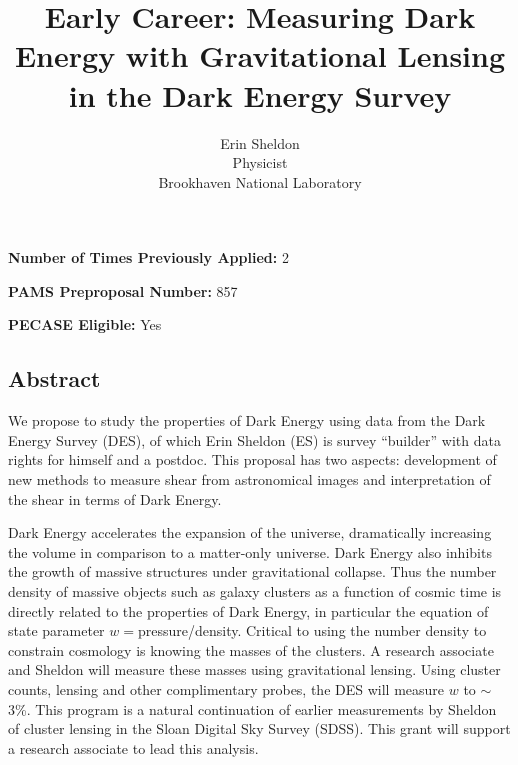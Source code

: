 \documentclass[12pt]{article}
\begin{document}
\vspace{3mm}
\noindent
{\bf Number of Times Previously Applied:} 2

\vspace{3mm}
\noindent
{\bf PAMS Preproposal Number:} 857


\vspace{3mm}
\noindent
{\bf PECASE Eligible:} Yes



\newpage

\tableofcontents

\newpage

\title{Early Career: Measuring Dark Energy with Gravitational Lensing in 
the Dark Energy Survey}
\author{Erin Sheldon\\
{\normalsize Physicist}\\
\normalsize{Brookhaven National Laboratory}}
\date{}
\maketitle

\setcounter{page}{1}
\begin{center}
\section*{Abstract}
\end{center}

We propose to study the properties of Dark Energy using data from the Dark
Energy Survey (DES), of which Erin Sheldon (ES) is survey ``builder'' with data
rights for himself and a postdoc.  This proposal has two aspects: development
of new methods to measure shear from astronomical images and interpretation of
the shear in terms of Dark Energy.

Dark Energy accelerates the expansion of the universe, dramatically increasing
the volume in comparison to a matter-only universe.  Dark Energy also inhibits
the growth of massive structures under gravitational collapse.  Thus the number
density of massive objects such as galaxy clusters as a function of cosmic time
is directly related to the properties of Dark Energy, in particular the
equation of state parameter $w=$pressure/density.  Critical to using the number
density to constrain cosmology is knowing the masses of the clusters. A
research associate and Sheldon will measure these masses using gravitational
lensing.  Using cluster counts, lensing and other complimentary probes, the DES
will measure $w$ to $\sim$3\%.  This program is a natural continuation of
earlier measurements by Sheldon of cluster lensing in the Sloan Digital Sky
Survey (SDSS).  This grant will support a research associate to lead this
analysis.
\end{document}
